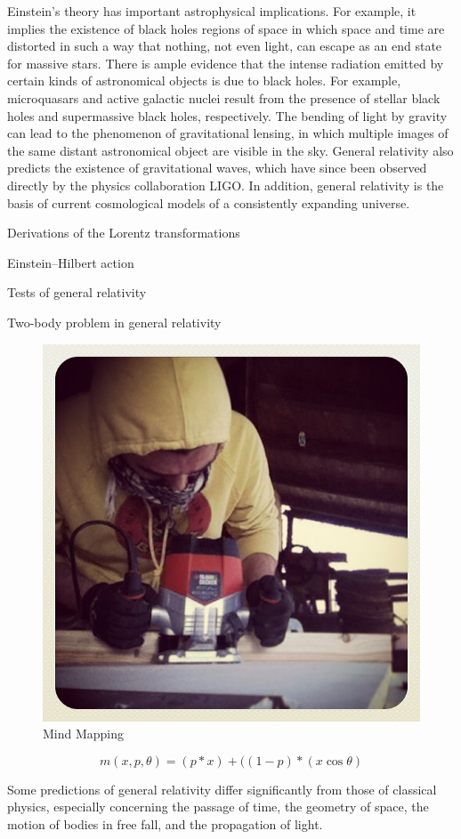 Einstein's theory has important astrophysical implications. For example, it
implies the existence of black holes regions of space in which space and time
are distorted in such a way that nothing, not even light, can escape as an
end state for massive stars. There is ample evidence that the intense radiation
emitted by certain kinds of astronomical objects is due to black holes. For
example, microquasars and active galactic nuclei result from the presence of
stellar black holes and supermassive black holes, respectively. The bending of
light by gravity can lead to the phenomenon of gravitational lensing, in which
multiple images of the same distant astronomical object are visible in the sky.
General relativity also predicts the existence of gravitational waves, which
have since been observed directly by the physics collaboration LIGO. In addition,
general relativity is the basis of current cosmological models of a consistently
expanding universe. \cite{gerzon_70b}

\begin{compactitem}
\item Derivations of the Lorentz transformations
\item Einstein–Hilbert action
\item Tests of general relativity
\item Two-body problem in general relativity
\end{compactitem}

\begin{figure}[t]
\centering
\includegraphics[width=.47\textwidth]{img/image2.jpg}
\caption{Mind Mapping}
\label{gs}
\end{figure}

\begin{equation}
m(x,p,\theta) = (p*x) + ((1-p)*(x\cos\theta)
\label{eq:mid}
\end{equation}

Some predictions of general relativity differ significantly from those of
classical physics, especially concerning the passage of time, the geometry of
space, the motion of bodies in free fall, and the propagation of light.

